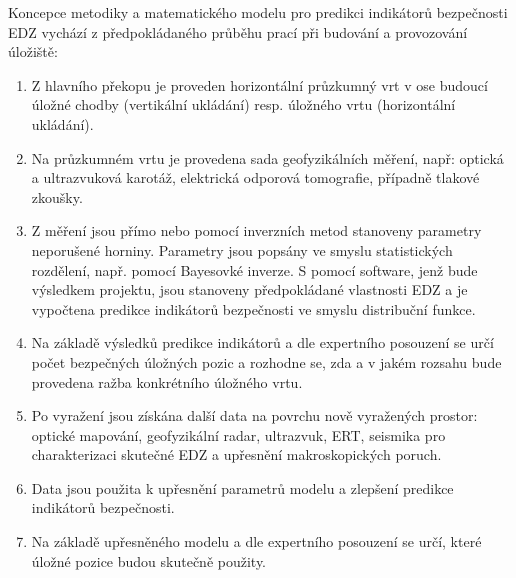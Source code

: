 \documentclass{article}
\begin{document}
Koncepce metodiky a matematického modelu pro predikci indikátorů bezpečnosti EDZ  vychází z předpokládaného průběhu prací při budování a provozování úložiště:
\begin{enumerate}
    \item Z hlavního překopu je proveden horizontální průzkumný vrt v ose budoucí úložné chodby (vertikální ukládání) resp. úložného vrtu (horizontální ukládání).
    \item Na průzkumném vrtu je provedena sada geofyzikálních měření, např: optická a ultrazvuková karotáž, elektrická odporová tomografie, případně tlakové zkoušky.

    \item \label{item_model1}
    Z měření jsou přímo nebo pomocí inverzních metod stanoveny parametry neporušené horniny. Parametry jsou popsány ve smyslu statistických rozdělení, např. pomocí Bayesovké inverze. S pomocí software, jenž bude výsledkem projektu, jsou stanoveny předpokládané vlastnosti EDZ a je vypočtena predikce indikátorů bezpečnosti ve smyslu distribuční funkce. 
    \item Na základě výsledků predikce indikátorů a dle expertního posouzení se určí počet bezpečných úložných pozic a rozhodne se, zda a v jakém rozsahu bude provedena ražba  konkrétního úložného vrtu.
    \item Po vyražení jsou získána další data na povrchu nově vyražených prostor: optické mapování, geofyzikální radar, ultrazvuk, ERT, seismika pro charakterizaci skutečné EDZ a 
          upřesnění makroskopických poruch.
    \item Data jsou použita k upřesnění parametrů modelu a zlepšení predikce indikátorů bezpečnosti.  
    \item \label{item_model2}
    Na základě upřesněného modelu a dle expertního posouzení se určí, které úložné pozice budou skutečně použity.
\end{enumerate}
\end{document}
